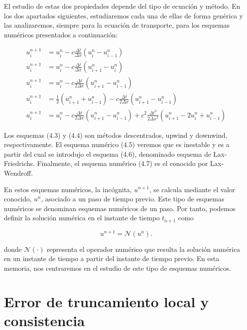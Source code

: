 El estudio de estas dos propiedades depende del tipo de ecuación y
método.
En los dos apartados siguientes, estudiaremos cada una de ellas de
forma genérica y las analizaremos, siempre para la ecuación de
transporte, para los esquemas numéricos presentados a continuación:

\begin{align}
  u^{n+1}_{i} & =
  u^{n}_{i}-
  c\frac{\Delta t}{\Delta x}
  \left(
  u^{n}_{i}-
  u^{n}_{i-1}
  \right)         \\
  u^{n+1}_{i} & =
  u^{n}_{i}-
  c\frac{\Delta t}{\Delta x}
  \left(
  u^{n}_{i+1}-
  u^{n}_{i}
  \right)         \\
  u^{n+1}_{i} & =
  u^{n}_{i}-
  c\frac{\Delta t}{2\Delta x}
  \left(
  u^{n}_{i+1}-u^{n}_{i-1}
  \right)         \\
  u^{n+1}_{i} & =
  \frac{1}{2}
  \left(
  u^{n}_{i+1}+
  u^{n}_{i-1}
  \right)-
  c\frac{\Delta t}{2\Delta x}
  \left(
  u^{n}_{i+1}-
  u^{n}_{i-1}
  \right)         \\
  u^{n+1}_{i} & =
  u^{n}_{i}-
  c\frac{\Delta t}{2\Delta x}
  \left(
  u^{n}_{i+1}-
  u^{n}_{i-1}
  \right)+
  c^{2}
  \frac{{\Delta t}^{2}}{2{\Delta x}^{2}}
  \left(
  u^{n}_{i+1}-
  2u^{n}_{i}+
  u^{n}_{i-1}
  \right)
\end{align}

Los esquemas (4.3) y (4.4) son métodos descentrados, upwind y downwind, respectivamente.
El esquema numérico (4.5) veremos que es inestable y es a partir del
cual se introdujo el esquema (4.6), denominado esquema de
Lax-Friedrichs.
Finalmente, el esquema numérico (4.7) es el conocido por
Lax-Wendroff.

En estos esquemas numéricos, la incógnita, $u^{n+1}$, se calcula
mediante el valor conocido, $u^{n}$, asociado a un paso de tiempo previo.
Este tipo de esquemas numéricos se denominan esquemas numéricos de un paso.
Por tanto, podemos definir la solución numérica en el instante de
tiempo $t_{n+1}$ como

\begin{equation*}
  u^{n+1}=
  \mathcal{N}\left(u^{n}\right).
\end{equation*}

donde $\mathcal{N}\left(\cdot\right)$ representa el operador numérico
que resulta la solución numérica en un instante de tiempo a partir
del instante de tiempo previo.
En esta memoria, nos centraremos en el estudio de este tipo de
esquemas numéricos.

\section{Error de truncamiento local y consistencia}

